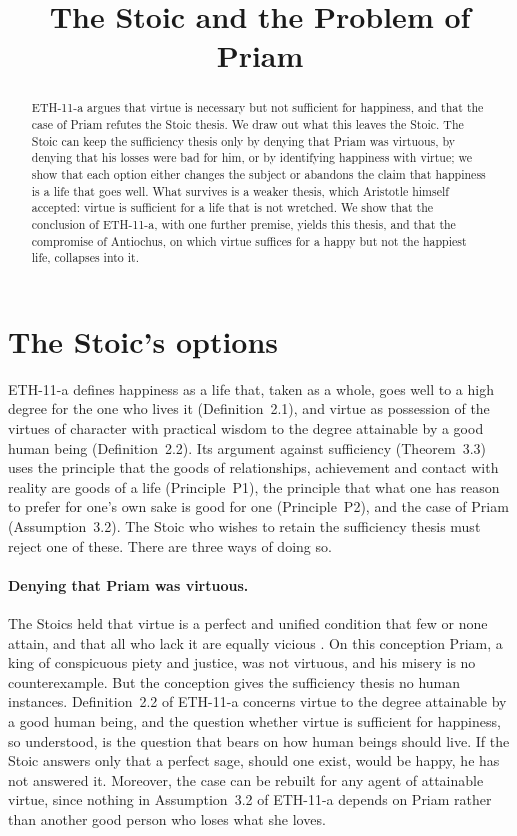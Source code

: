 \documentclass{situationist-preprint}
\title{The Stoic and the Problem of Priam}
\begin{document}
\maketitle

\begin{abstract}
ETH-11-a argues that virtue is necessary but not sufficient for happiness, and that the case of Priam refutes the Stoic thesis. We draw out what this leaves the Stoic. The Stoic can keep the sufficiency thesis only by denying that Priam was virtuous, by denying that his losses were bad for him, or by identifying happiness with virtue; we show that each option either changes the subject or abandons the claim that happiness is a life that goes well. What survives is a weaker thesis, which Aristotle himself accepted: virtue is sufficient for a life that is not wretched. We show that the conclusion of ETH-11-a, with one further premise, yields this thesis, and that the compromise of Antiochus, on which virtue suffices for a happy but not the happiest life, collapses into it.
\end{abstract}

\section{The Stoic's options}

ETH-11-a defines happiness as a life that, taken as a whole, goes well to a high degree for the one who lives it (Definition~2.1), and virtue as possession of the virtues of character with practical wisdom to the degree attainable by a good human being (Definition~2.2). Its argument against sufficiency (Theorem~3.3) uses the principle that the goods of relationships, achievement and contact with reality are goods of a life (Principle~P1), the principle that what one has reason to prefer for one's own sake is good for one (Principle~P2), and the case of Priam (Assumption~3.2). The Stoic who wishes to retain the sufficiency thesis must reject one of these. There are three ways of doing so.

\paragraph{Denying that Priam was virtuous.} The Stoics held that virtue is a perfect and unified condition that few or none attain, and that all who lack it are equally vicious \citep{LongSedley1987}. On this conception Priam, a king of conspicuous piety and justice, was not virtuous, and his misery is no counterexample. But the conception gives the sufficiency thesis no human instances. Definition~2.2 of ETH-11-a concerns virtue to the degree attainable by a good human being, and the question whether virtue is sufficient for happiness, so understood, is the question that bears on how human beings should live. If the Stoic answers only that a perfect sage, should one exist, would be happy, he has not answered it. Moreover, the case can be rebuilt for any agent of attainable virtue, since nothing in Assumption~3.2 of ETH-11-a depends on Priam rather than another good person who loses what she loves.
\end{document}
